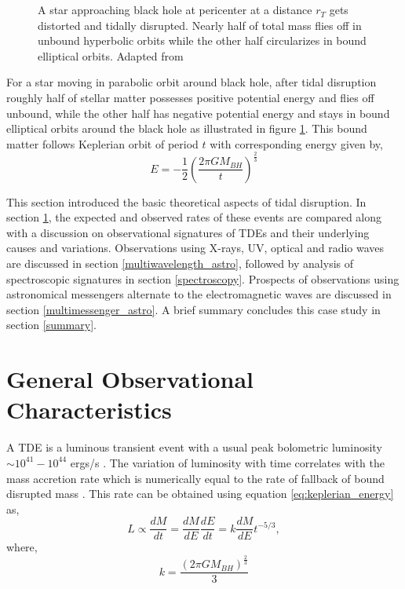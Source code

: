 \documentclass{tda}
\begin{document}
\begin{figure} [h]
\begin{minipage} {.45\textwidth}
		\caption{A star approaching black hole at pericenter at a distance \(r^{}_T\) gets distorted and tidally disrupted. Nearly half of total mass flies off in unbound hyperbolic orbits while the other half circularizes in bound elliptical orbits. Adapted from \cite{rees_tidal_1988}}
		\label{fig:rees1988}
	\end{minipage}
\end{figure}

For a star moving in parabolic orbit around black hole, after tidal disruption roughly half of stellar matter possesses positive potential energy and flies off unbound, while the other half has negative potential energy and stays in bound elliptical orbits around the black hole as illustrated in figure \ref{fig:rees1988}. This bound matter follows Keplerian orbit of period \(t\) with corresponding energy given by,
\begin{equation}
	E = -\frac{1}{2} \left( \frac{2 \pi G M^{}_{BH}}{t} \right)^\frac{2}{3}
	\label{eq:keplerian_energy}
\end{equation}

This section introduced the basic theoretical aspects of tidal disruption. In section \ref{gen_observations}, the expected and observed rates of these events are compared along with a discussion on observational signatures of TDEs and their underlying causes and variations. Observations using X-rays, UV, optical and radio waves are discussed in section \ref{multiwavelength_astro}, followed by analysis of spectroscopic signatures in section \ref{spectroscopy}. Prospects of observations using astronomical messengers alternate to the electromagnetic waves are discussed in section \ref{multimessenger_astro}. A brief summary concludes this case study in section \ref{summary}.


\section{General Observational Characteristics} \label{gen_observations}

A TDE is a luminous transient event with a usual peak bolometric luminosity \(\sim 10^{41} - 10^{44}\) ergs/s \cite{lodato_multiband_2011, bonnerot_simulating_2020}. The variation of luminosity with time correlates with the mass accretion rate which is numerically equal to the rate of fallback of bound disrupted mass \cite{phinney_manifestations_1989}. This rate can be obtained using equation \ref{eq:keplerian_energy} as,
\begin{equation}
	L \propto \frac{dM}{dt} = \frac{dM}{dE} \frac{dE}{dt} = k \frac{dM}{dE} t^{-5/3},
	\label{eq:tde_luminosity_time}
\end{equation}
where, \[k=\frac{\left({2 \pi G M^{}_{BH}}\right)^{\frac{2}{3}}}{3}\]
\end{document}
